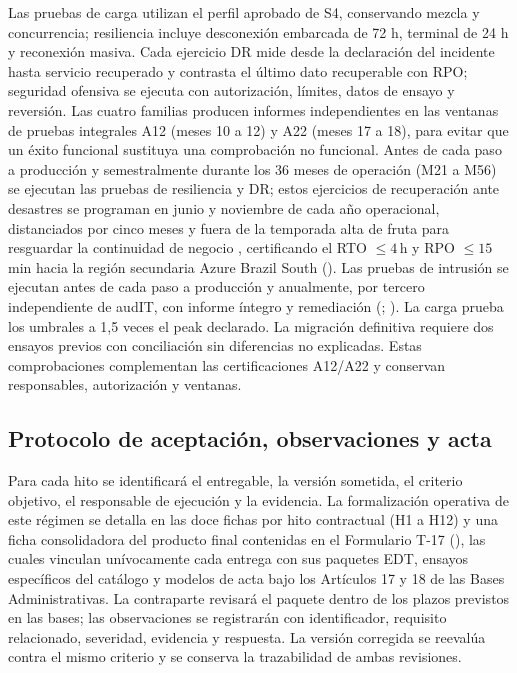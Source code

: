 Las pruebas de carga utilizan el perfil aprobado de S4, conservando mezcla y concurrencia; resiliencia incluye desconexión embarcada de 72 h, terminal de 24 h y reconexión masiva. Cada ejercicio DR mide desde la declaración del incidente hasta servicio recuperado y contrasta el último dato recuperable con RPO; seguridad ofensiva se ejecuta con autorización, límites, datos de ensayo y reversión. Las cuatro familias producen informes independientes en las ventanas de pruebas integrales A12 (meses 10 a 12) y A22 (meses 17 a 18), para evitar que un éxito funcional sustituya una comprobación no funcional. Antes de cada paso a producción y semestralmente durante los 36 meses de operación (M21 a M56) se ejecutan las pruebas de resiliencia y DR; estos ejercicios de recuperación ante desastres se programan en junio y noviembre de cada año operacional, distanciados por cinco meses y fuera de la temporada alta de fruta para resguardar la continuidad de negocio , certificando el RTO $\le 4$\,h y RPO $\le 15$\,min hacia la región secundaria Azure Brazil South (). Las pruebas de intrusión se ejecutan antes de cada paso a producción y anualmente, por tercero independiente de audIT, con informe íntegro y remediación (; ). La carga prueba los umbrales a 1,5 veces el peak declarado. La migración definitiva requiere dos ensayos previos con conciliación sin diferencias no explicadas. Estas comprobaciones complementan las certificaciones A12/A22 y conservan responsables, autorización y ventanas.

\subsection{Protocolo de aceptación, observaciones y acta}\label{sec:9-protocolo-aceptacion}

Para cada hito se identificará el entregable, la versión sometida, el criterio objetivo, el responsable de ejecución y la evidencia. La formalización operativa de este régimen se detalla en las doce fichas por hito contractual (H1 a H12) y una ficha consolidadora del producto final contenidas en el Formulario T-17 (), las cuales vinculan unívocamente cada entrega con sus paquetes EDT, ensayos específicos del catálogo y modelos de acta bajo los Artículos 17 y 18 de las Bases Administrativas. La contraparte revisará el paquete dentro de los plazos previstos en las bases; las observaciones se registrarán con identificador, requisito relacionado, severidad, evidencia y respuesta. La versión corregida se reevalúa contra el mismo criterio y se conserva la trazabilidad de ambas revisiones.

